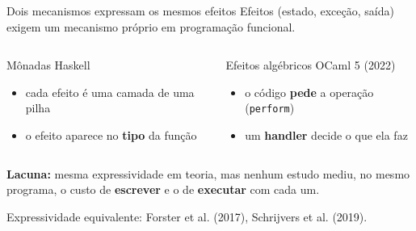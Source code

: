 \documentclass[aspectratio=169,10pt]{beamer}
\begin{document}
\begin{frame}{Dois mecanismos expressam os mesmos efeitos}
  Efeitos (estado, exceção, saída) exigem um mecanismo próprio em programação funcional.
  \vspace{6pt}
  \begin{columns}[T]
    \begin{block}{Mônadas \textperiodcentered{} Haskell}
      \begin{itemize}
        \item cada efeito é uma camada de uma pilha
        \item o efeito aparece no \textbf{tipo} da função
      \end{itemize}
    \end{block}
    \begin{block}{Efeitos algébricos \textperiodcentered{} OCaml 5 (2022)}
      \begin{itemize}
        \item o código \textbf{pede} a operação (\texttt{perform})
        \item um \textbf{handler} decide o que ela faz
      \end{itemize}
    \end{block}
  \end{columns}
  \vspace{10pt}
  \textbf{Lacuna:} mesma expressividade em teoria, mas nenhum estudo mediu, no mesmo programa,
  o custo de \textbf{escrever} e o de \textbf{executar} com cada um.

  \vfill
  {\small\color{neutral} Expressividade equivalente: Forster et al. (2017), Schrijvers et al. (2019).}
\end{frame}
\end{document}
